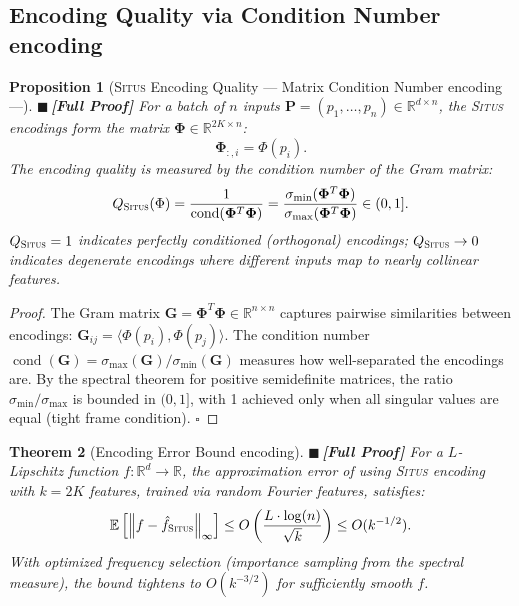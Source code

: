 \documentclass[12pt,a4paper]{article}
\newtheorem{theorem}{Theorem}[section]
\newtheorem{proposition}[theorem]{Proposition}
\theoremstyle{definition}
\newcommand{\rigorFull}{{\color{rigorcolor}$\blacksquare$\,\textbf{[Full Proof]}}}
\newcommand{\Situs}{\textsc{Situs}}
\DeclareMathOperator{\cond}{cond}
\newcommand{\R}{\mathbb{R}}
\newcommand{\E}{\mathbb{E}}
\newcommand{\norm}[1]{\left\lVert#1\right\rVert}
\newcommand{\inner}[2]{\langle #1, #2 \rangle}
\newcommand{\mat}[1]{\mathbf{#1}}
\newcommand{\smax}{\sigma_{\max}}
\newcommand{\smin}{\sigma_{\min}}
\begin{document}
\subsection{Encoding Quality via Condition Number encoding}

\begin{proposition}[\Situs{} Encoding Quality — Matrix Condition Number encoding---]\label{prop:situs_condition}
\rigorFull
For a batch of $n$ inputs $\mat{P} = (p_1, \ldots, p_n) \in \R^{d \times n}$, the 
\Situs{} encodings form the matrix $\boldsymbol{\Phi} \in \R^{2K \times n}$:
\[
\boldsymbol{\Phi}_{:,i} = \Phi(p_i).
\]
The encoding quality is measured by the condition number of the Gram matrix:
\begin{equation}\label{eq:situs_quality}
    Q_{\Situs}(\Phi) = \frac{1}{\cond(\boldsymbol{\Phi}^T \boldsymbol{\Phi})} = \frac{\smin(\boldsymbol{\Phi}^T \boldsymbol{\Phi})}{\smax(\boldsymbol{\Phi}^T \boldsymbol{\Phi})} \in (0,1].
\end{equation}
$Q_{\Situs} = 1$ indicates perfectly conditioned (orthogonal) encodings; 
$Q_{\Situs} \to 0$ indicates degenerate encodings where different inputs map to 
nearly collinear features.
\end{proposition}

\begin{proof}
The Gram matrix $\mat{G} = \boldsymbol{\Phi}^T \boldsymbol{\Phi} \in \R^{n \times n}$ 
captures pairwise similarities between encodings: $\mat{G}_{ij} = \inner{\Phi(p_i)}{\Phi(p_j)}$.
The condition number $\cond(\mat{G}) = \smax(\mat{G})/\smin(\mat{G})$ measures how 
well-separated the encodings are. By the spectral theorem for positive semidefinite
matrices, the ratio $\smin/\smax$ is bounded in $(0,1]$, with 1 achieved only when 
all singular values are equal (tight frame condition). \hfill $\square$
\end{proof}

\begin{theorem}[Encoding Error Bound encoding]\label{thm:situs_error_bound}
\rigorFull
For a $L$-Lipschitz function $f: \R^d \to \R$, the approximation error of using 
\Situs{} encoding with $k = 2K$ features, trained via random Fourier features, satisfies:
\begin{equation}\label{eq:situs_error}
    \E\left[\norm{f - \hat{f}_{\Situs}}_\infty\right] \leq O\left(\frac{L \cdot \log(n)}{\sqrt{k}}\right) \leq O(k^{-1/2}).
\end{equation}
With optimized frequency selection (importance sampling from the spectral measure), 
the bound tightens to $O(k^{-3/2})$ for sufficiently smooth $f$.
\end{theorem}
\end{document}
